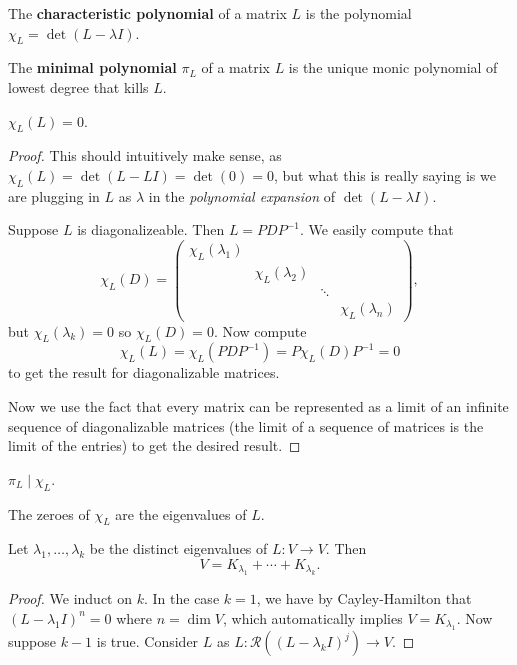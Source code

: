 \begin{df}
The \textbf{characteristic polynomial} of a matrix $L$ is the polynomial
$\chi_L = \det(L - \lambda I)$.
\end{df}

\begin{df}
The \textbf{minimal polynomial} $\pi_L$ of a matrix $L$ is the unique
monic polynomial of lowest degree that kills $L$.
\end{df}

\begin{thm}
$\chi_L(L) = 0$.
\end{thm}

\begin{proof}
This should intuitively make sense, as $\chi_L(L) = \det(L - LI) =
\det(0) = 0$, but what this is really saying is we are plugging in $L$
as $\lambda$ in the \emph{polynomial expansion} of $\det(L - \lambda
I)$.

Suppose $L$ is diagonalizeable. Then $L = PDP^{-1}$. We easily compute
that
\[ \chi_L(D) = \begin{pmatrix}
\chi_L(\lambda_1) & & \\
& \chi_L(\lambda_2) & & \\
& & \ddots & \\
& & & \chi_L(\lambda_n)
\end{pmatrix}, \]
but $\chi_L(\lambda_k) = 0$ so $\chi_L(D) = 0$. Now compute
\[ \chi_L(L) = \chi_L(PDP^{-1}) = P\chi_L(D)P^{-1} = 0 \]
to get the result for diagonalizable matrices.

Now we use the fact that every matrix can be represented as a limit of
an infinite sequence of diagonalizable matrices (the limit of a sequence
of matrices is the limit of the entries) to get the desired result.
\end{proof}

\begin{cor}
$\pi_L \mid \chi_L$.
\end{cor}

\begin{prop}
The zeroes of $\chi_L$ are the eigenvalues of $L$.
\end{prop}

\begin{lem}
Let $\lambda_1, \dots, \lambda_k$ be the distinct eigenvalues of $L : V
\rightarrow V$. Then
\[ V = K_{\lambda_1} + \cdots + K_{\lambda_k}. \]
\end{lem}

\begin{proof}
We induct on $k$. In the case $k = 1$, we have by Cayley-Hamilton that
$(L - \lambda_1 I)^n = 0$ where $n = \dim V$, which automatically
implies $V = K_{\lambda_1}$. Now suppose $k - 1$ is true. Consider $L$
as $L : \mathcal{R}((L - \lambda_k I)^j) \rightarrow V$.
\end{proof}
